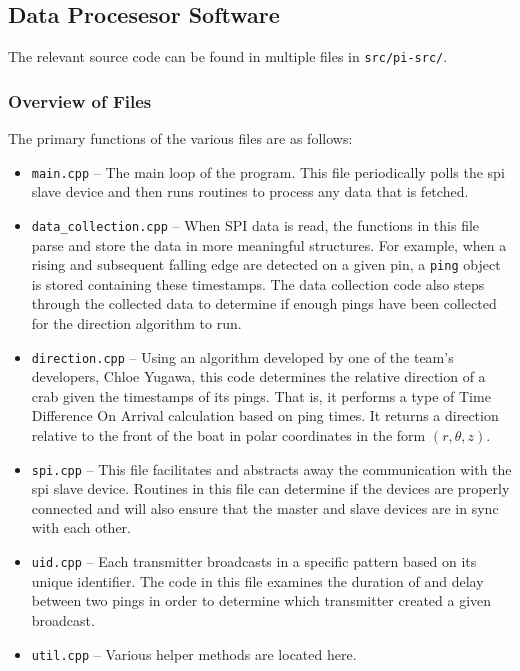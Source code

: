 \documentclass[12pt]{article}
\begin{document}
\subsection{Data Procesesor Software}\label{sec:sw-data-proc}

The relevant source code can be found in multiple files in
\texttt{src/pi-src/}.

\subsubsection{Overview of Files}

The primary functions of the various files are as follows:
\begin{itemize}
\item \texttt{main.cpp} --
	The main loop of the program. This file periodically polls the
	\gls{spi} slave device and then runs routines to process any data that
	is fetched.
\item \texttt{data\_collection.cpp} --
	When SPI data is read, the functions in this file parse and store the
	data in more meaningful structures.
	For example, when a rising and subsequent falling edge are detected on a
	given pin, a \texttt{ping} object is stored containing these timestamps.
	The data collection code also steps through the collected data to determine
	if enough pings have been collected for the direction algorithm to run.
\item \texttt{direction.cpp} --
	Using an algorithm developed by one of the team's developers, Chloe Yugawa,
	this code determines the relative direction of a crab given the timestamps
	of its pings.
	That is, it performs a type of Time Difference On Arrival calculation
	based on ping times.
	It returns a direction relative to the front of the boat in polar
	coordinates in the form $(r, \theta, z)$.
\item \texttt{spi.cpp} --
	This file facilitates and abstracts away the communication with the
	\gls{spi} slave device.
	Routines in this file can determine if the devices are properly connected
	and will also ensure that the master and slave devices are in
	sync with each other.
\item \texttt{uid.cpp} --
	Each transmitter broadcasts in a specific pattern based on its unique
	identifier. The code in this file examines the duration of and delay
	between two pings in order to determine which transmitter created a
	given broadcast.
\item \texttt{util.cpp} --
	Various helper methods are located here.
\end{itemize}
\end{document}
